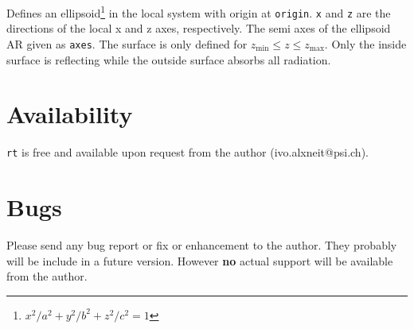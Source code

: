 \documentclass[10pt,a4paper,titlepage]{article}
\newcommand{\rt}{{\tt rt} }
\begin{document}









Defines an ellipsoid\footnote{${x^2}/{a^2}+{y^2}/{b^2}+{z^2}/{c^2}=1$} in the local system with origin at {\tt origin}. {\tt x} and {\tt z} are the directions of the local x and z axes, respectively. The semi axes of the ellipsoid AR given as {\tt axes}. The surface is only defined for $z_\mathrm{min} \leq z \leq z_\mathrm{max}$. Only the inside surface is reflecting while the outside surface absorbs all radiation.


\section{Availability}
\rt is free and available upon request from the author (ivo.alxneit@psi.ch).



\section{Bugs} Please send any bug report or fix or enhancement to the author. They probably will be include in a future version. However {\bf no} actual support will be available from the author.
\end{document}
